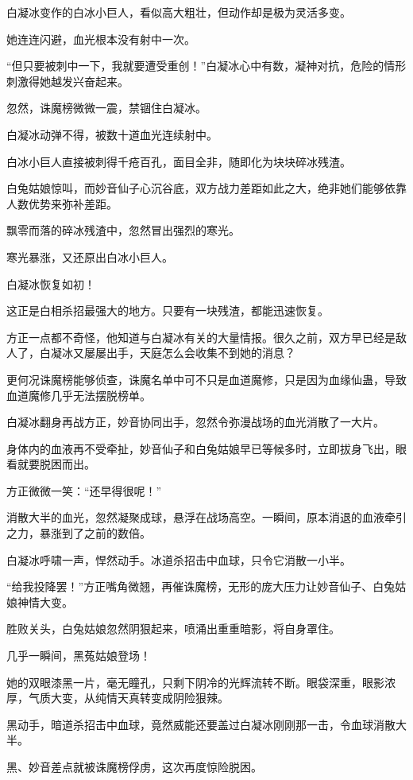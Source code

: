 \begin{this_body}
白凝冰变作的白冰小巨人，看似高大粗壮，但动作却是极为灵活多变。

她连连闪避，血光根本没有射中一次。

“但只要被刺中一下，我就要遭受重创！”白凝冰心中有数，凝神对抗，危险的情形刺激得她越发兴奋起来。

忽然，诛魔榜微微一震，禁锢住白凝冰。

白凝冰动弹不得，被数十道血光连续射中。

白冰小巨人直接被刺得千疮百孔，面目全非，随即化为块块碎冰残渣。

白兔姑娘惊叫，而妙音仙子心沉谷底，双方战力差距如此之大，绝非她们能够依靠人数优势来弥补差距。

飘零而落的碎冰残渣中，忽然冒出强烈的寒光。

寒光暴涨，又还原出白冰小巨人。

白凝冰恢复如初！

这正是白相杀招最强大的地方。只要有一块残渣，都能迅速恢复。

方正一点都不奇怪，他知道与白凝冰有关的大量情报。很久之前，双方早已经是敌人了，白凝冰又屡屡出手，天庭怎么会收集不到她的消息？

更何况诛魔榜能够侦查，诛魔名单中可不只是血道魔修，只是因为血缘仙蛊，导致血道魔修几乎无法摆脱榜单。

白凝冰翻身再战方正，妙音协同出手，忽然令弥漫战场的血光消散了一大片。

身体内的血液再不受牵扯，妙音仙子和白兔姑娘早已等候多时，立即拔身飞出，眼看就要脱困而出。

方正微微一笑：“还早得很呢！”

消散大半的血光，忽然凝聚成球，悬浮在战场高空。一瞬间，原本消退的血液牵引之力，暴涨到了之前的数倍。

白凝冰呼啸一声，悍然动手。冰道杀招击中血球，只令它消散一小半。

“给我投降罢！”方正嘴角微翘，再催诛魔榜，无形的庞大压力让妙音仙子、白兔姑娘神情大变。

胜败关头，白兔姑娘忽然阴狠起来，喷涌出重重暗影，将自身罩住。

几乎一瞬间，黑菟姑娘登场！

她的双眼漆黑一片，毫无瞳孔，只剩下阴冷的光辉流转不断。眼袋深重，眼影浓厚，气质大变，从纯情天真转变成阴险狠辣。

黑动手，暗道杀招击中血球，竟然威能还要盖过白凝冰刚刚那一击，令血球消散大半。

黑、妙音差点就被诛魔榜俘虏，这次再度惊险脱困。


\end{this_body}
